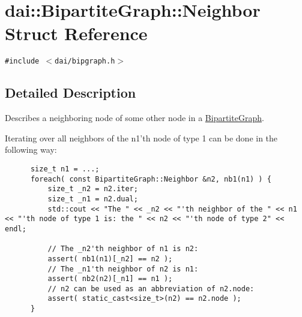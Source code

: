 \hypertarget{structdai_1_1BipartiteGraph_1_1Neighbor}{
\section{dai::BipartiteGraph::Neighbor Struct Reference}
\label{structdai_1_1BipartiteGraph_1_1Neighbor}
}
{\tt \#include $<$dai/bipgraph.h$>$}



\subsection{Detailed Description}
Describes a neighboring node of some other node in a \hyperlink{classdai_1_1BipartiteGraph}{BipartiteGraph}. 

Iterating over all neighbors of the n1'th node of type 1 can be done in the following way: 

\begin{Code}\begin{verbatim}      size_t n1 = ...;
      foreach( const BipartiteGraph::Neighbor &n2, nb1(n1) ) {
          size_t _n2 = n2.iter;
          size_t _n1 = n2.dual;
          std::cout << "The " << _n2 << "'th neighbor of the " << n1 << "'th node of type 1 is: the " << n2 << "'th node of type 2" << endl;

          // The _n2'th neighbor of n1 is n2:
          assert( nb1(n1)[_n2] == n2 );
          // The _n1'th neighbor of n2 is n1:
          assert( nb2(n2)[_n1] == n1 );
          // n2 can be used as an abbreviation of n2.node:
          assert( static_cast<size_t>(n2) == n2.node );
      }
\end{verbatim}
\end{Code}

